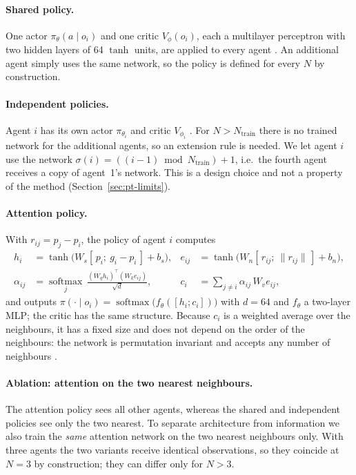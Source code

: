 \paragraph{Shared policy.}
One actor $\pi_\theta(a\mid o_i)$ and one critic $V_\phi(o_i)$, each a multilayer perceptron with two hidden layers
of 64 $\tanh$ units, are applied to every agent \citep{gupta2017}. An additional agent simply uses the same
network, so the policy is defined for every $N$ by construction.

\paragraph{Independent policies.}
Agent $i$ has its own actor $\pi_{\theta_i}$ and critic $V_{\phi_i}$ \citep{tan1993}. For $N>N_{\text{train}}$
there is no trained network for the additional agents, so an extension rule is needed. We let agent $i$ use the
network $\sigma(i)=((i-1)\bmod N_{\text{train}})+1$, i.e.\ the fourth agent receives a copy of agent~1's network.
This is a design choice and not a property of the method (Section~\ref{sec:pt-limits}).

\paragraph{Attention policy.}
With $r_{ij}=p_j-p_i$, the policy of agent $i$ computes
\begin{align}
  h_i &= \tanh\!\big(W_s[\,p_i;\ g_i-p_i\,]+b_s\big), &
  e_{ij} &= \tanh\!\big(W_n[\,r_{ij};\ \|r_{ij}\|\,]+b_n\big),\\
  \alpha_{ij} &= \operatorname*{softmax}_{j}\ \frac{(W_q h_i)^{\top}(W_k e_{ij})}{\sqrt d}, &
  c_i &= \sum_{j\neq i}\alpha_{ij}\,W_v e_{ij},
\end{align}
and outputs $\pi(\cdot\mid o_i)=\operatorname{softmax}\big(f_\theta([h_i;c_i])\big)$ with $d=64$ and $f_\theta$ a
two-layer MLP; the critic has the same structure. Because $c_i$ is a weighted average over the neighbours, it has
a fixed size and does not depend on the order of the neighbours: the network is permutation invariant and accepts
any number of neighbours \citep{zaheer2017}.

\paragraph{Ablation: attention on the two nearest neighbours.}
The attention policy sees all other agents, whereas the shared and independent policies see only the two nearest.
To separate architecture from information we also train the \emph{same} attention network on the two nearest
neighbours only. With three agents the two variants receive identical observations, so they coincide at $N=3$ by
construction; they can differ only for $N>3$.

